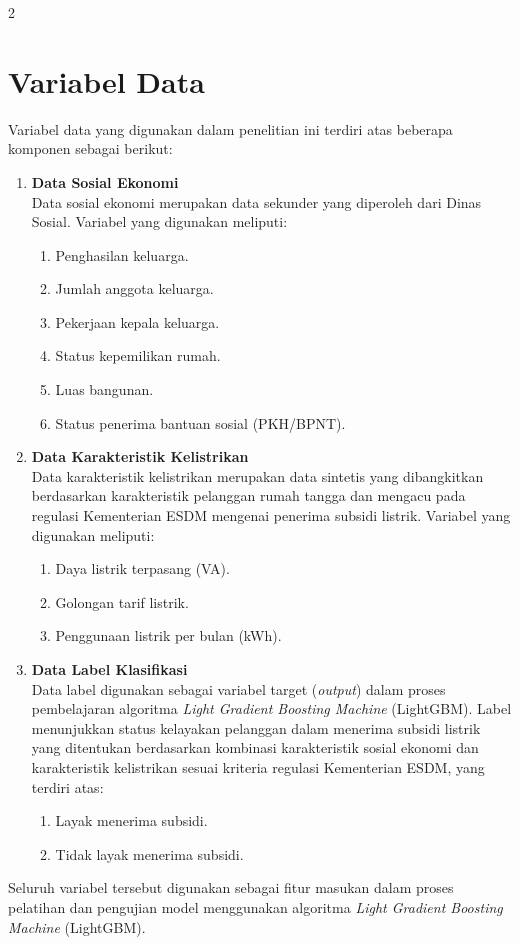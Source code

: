 \documentclass[12pt, a4paper, onecolumn, oneside]{report}
\begin{document}
\begin{spacing}{2}
\section{Variabel Data}
Variabel data yang digunakan dalam penelitian ini terdiri atas beberapa komponen sebagai berikut:
\begin{enumerate}
    \item \textbf{Data Sosial Ekonomi} \\
    Data sosial ekonomi merupakan data sekunder yang diperoleh dari Dinas Sosial. Variabel yang digunakan meliputi:
    \begin{enumerate}
        \item Penghasilan keluarga.
        \item Jumlah anggota keluarga.
        \item Pekerjaan kepala keluarga.
        \item Status kepemilikan rumah.
        \item Luas bangunan.
        \item Status penerima bantuan sosial (PKH/BPNT).
    \end{enumerate}
    \item \textbf{Data Karakteristik Kelistrikan} \\
    Data karakteristik kelistrikan merupakan data sintetis yang dibangkitkan berdasarkan karakteristik pelanggan rumah tangga dan mengacu pada regulasi Kementerian ESDM mengenai penerima subsidi listrik. Variabel yang digunakan meliputi:
    \begin{enumerate}
        \item Daya listrik terpasang (VA).
        \item Golongan tarif listrik.
        \item Penggunaan listrik per bulan (kWh).
    \end{enumerate}
    \item \textbf{Data Label Klasifikasi} \\
    Data label digunakan sebagai variabel target (\textit{output}) dalam proses pembelajaran algoritma \textit{Light Gradient Boosting Machine} (LightGBM). Label menunjukkan status kelayakan pelanggan dalam menerima subsidi listrik yang ditentukan berdasarkan kombinasi karakteristik sosial ekonomi dan karakteristik kelistrikan sesuai kriteria regulasi Kementerian ESDM, yang terdiri atas:
    \begin{enumerate}
        \item Layak menerima subsidi.
        \item Tidak layak menerima subsidi.
    \end{enumerate}
\end{enumerate}
Seluruh variabel tersebut digunakan sebagai fitur masukan dalam proses pelatihan dan pengujian model menggunakan algoritma \textit{Light Gradient Boosting Machine} (LightGBM).


\end{spacing}
\end{document}
